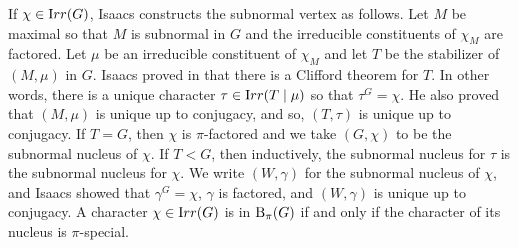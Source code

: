 \documentclass[12pt]{article}
\newtheorem{lemma}[theorem]{Lemma}
\def\irr#1{{\textrm  Irr}(#1)}
\def\B#1#2{{\textrm B}_{#1} (#2)}
\def\Bpi#1{\B {\pi}{#1}}
\begin{document}





If $\chi \in \irr G$, Isaacs constructs the subnormal vertex as
follows.  Let $M$ be maximal so that $M$ is subnormal in $G$ and the
irreducible constituents of $\chi_M$ are factored.  Let $\mu$ be an
irreducible constituent of $\chi_M$ and let $T$ be the stabilizer of
$(M,\mu)$ in $G$.  Isaacs proved in \cite{pisep} that there is a
Clifford theorem for $T$.  In other words, there is a unique
character $\tau \in \irr {T \mid \mu}$ so that $\tau^G = \chi$.  He
also proved that $(M,\mu)$ is unique up to conjugacy, and so,
$(T,\tau)$ is unique up to conjugacy.  If $T = G$, then $\chi$ is
$\pi$-factored and we take $(G,\chi)$ to be the subnormal nucleus of
$\chi$.  If $T < G$, then inductively, the subnormal nucleus for
$\tau$ is the subnormal nucleus for $\chi$.  We write $(W,\gamma)$
for the subnormal nucleus of $\chi$, and Isaacs showed that
$\gamma^G = \chi$, $\gamma$ is factored, and $(W,\gamma)$ is unique
up to conjugacy.  A character $\chi \in \irr G$ is in $\Bpi G$ if
and only if the character of its nucleus is $\pi$-special.
\end{document}
